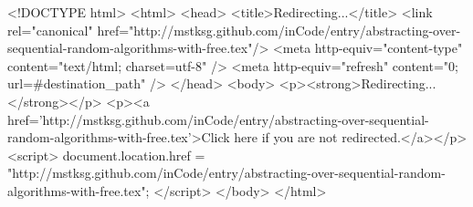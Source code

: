<!DOCTYPE html>
<html>
<head>
<title>Redirecting...</title>
<link rel="canonical" href="http://mstksg.github.com/inCode/entry/abstracting-over-sequential-random-algorithms-with-free.tex"/>
<meta http-equiv="content-type" content="text/html; charset=utf-8" />
<meta http-equiv="refresh" content="0; url=#{destination_path}" />
</head>
<body>
  <p><strong>Redirecting...</strong></p>
  <p><a href='http://mstksg.github.com/inCode/entry/abstracting-over-sequential-random-algorithms-with-free.tex'>Click here if you are not redirected.</a></p>
  <script>
    document.location.href = "http://mstksg.github.com/inCode/entry/abstracting-over-sequential-random-algorithms-with-free.tex";
  </script>
</body>
</html>
